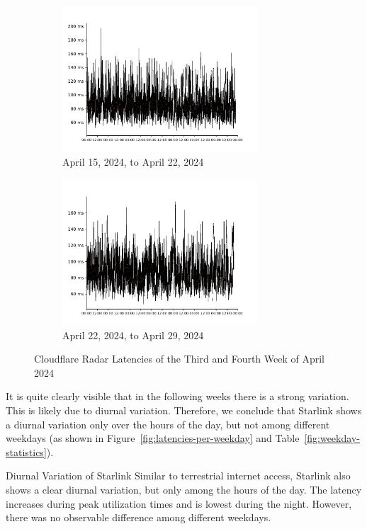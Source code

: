 \begin{figure}
	\centering
	\begin{subfigure}[b]{\textwidth}
		\centering
		\includegraphics[width=0.8\textwidth]{chapters/4-results/latency/img/cf_radar_latencies_2024-04-15_2024-04-22.pdf}
		\caption{April 15, 2024, to April 22, 2024}
	\end{subfigure}
	\begin{subfigure}[b]{\textwidth}
		\centering
		\includegraphics[width=0.8\textwidth]{chapters/4-results/latency/img/cf_radar_latencies_2024-04-22_2024-04-29.pdf}
		\caption{April 22, 2024, to April 29, 2024}
	\end{subfigure}
	\caption{Cloudflare Radar Latencies of the Third and Fourth Week of April 2024}
	\label{fig:latency-per-weekday-weeks-2}
\end{figure}

It is quite clearly visible that in the following weeks there is a strong
variation. This is likely due to diurnal variation. Therefore, we conclude that
Starlink shows a diurnal variation only over the hours of the day, but not
among different weekdays (as shown in Figure~\ref{fig:latencies-per-weekday}
and Table~\ref{fig:weekday-statistics}).

\begin{takeaway}{Diurnal Variation of Starlink}
	Similar to terrestrial internet access, Starlink also shows a clear
	diurnal variation, but only among the hours of the day. The latency
	increases during peak utilization times and is lowest during the night.
	However, there was no observable difference among different weekdays.
\end{takeaway}
